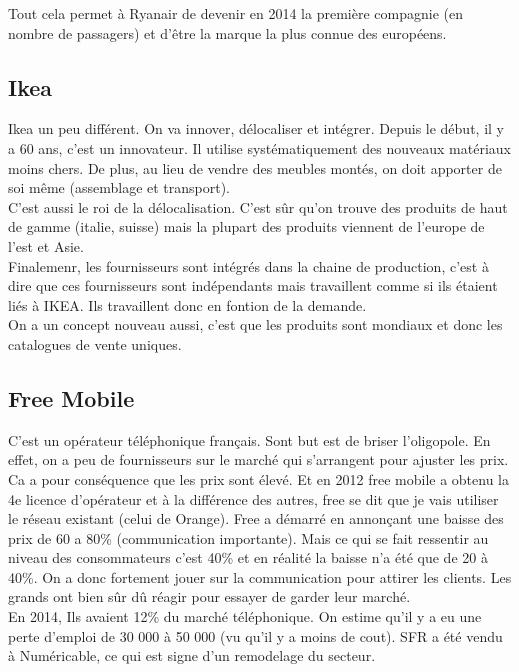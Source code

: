 Tout cela permet à Ryanair de devenir en 2014 la première compagnie (en nombre de passagers) et d'être la marque la plus connue des européens. 

\subsection{Ikea}
Ikea un peu différent. On va innover, délocaliser et intégrer. Depuis le début, il y a 60 ans, c’est un innovateur. Il utilise systématiquement des nouveaux matériaux moins chers. De plus, au lieu de vendre des meubles montés, on doit apporter de soi même (assemblage et transport).\\
C'est aussi le roi de la délocalisation. C’est sûr qu’on trouve des produits de haut de gamme (italie, suisse) mais la plupart des produits viennent de l’europe de l’est et Asie. \\
Finalemenr, les fournisseurs sont intégrés dans la chaine de production, c'est à dire que ces fournisseurs sont indépendants mais travaillent comme si ils étaient liés à IKEA. Ils travaillent donc en fontion de la demande. \\ 
On a un concept nouveau aussi, c’est que les produits sont mondiaux et donc les catalogues de vente uniques.

\subsection{Free Mobile} 
C'est un opérateur téléphonique français. Sont but est de briser l’oligopole. En effet, on a peu de fournisseurs sur le marché qui s’arrangent pour ajuster les prix. Ca a pour conséquence que les prix sont élevé. Et en 2012 free mobile a obtenu la 4e licence d’opérateur et à la différence des autres, free se dit que je vais utiliser le réseau existant (celui de Orange). Free a démarré en annonçant une baisse des prix de 60 a 80\% (communication importante). Mais ce qui se fait ressentir au niveau des consommateurs c’est 40\% et en réalité la baisse n'a été que de 20 à 40\%. On a donc fortement jouer sur la communication pour attirer les clients. Les grands ont bien sûr dû réagir pour essayer de garder leur marché.\\
En 2014, Ils avaient 12\% du marché téléphonique. On estime qu’il y a eu une perte d’emploi de 30 000 à 50 000 (vu qu’il y a moins de cout). SFR a été vendu à Numéricable, ce qui est signe d'un remodelage du secteur. 

\newpage 
